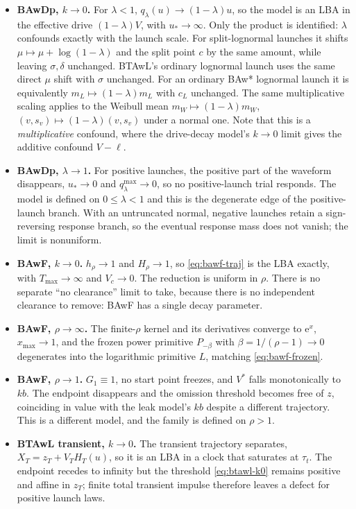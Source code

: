 \documentclass[12pt]{article}
\newcommand{\e}{\mathrm{e}}
\theoremstyle{remark}
\begin{document}
\begin{itemize}
  \item \textbf{BAwDp, $k \to 0$.} For $\lambda<1$, $q_{\lambda}(u) \to (1-\lambda)u$, so the model is an LBA in the effective drive $(1-\lambda)V$, with $u_{*}\to\infty$. Only the product is identified: $\lambda$ confounds exactly with the launch scale. For split-lognormal launches it shifts $\mu \mapsto \mu+\log(1-\lambda)$ and the split point $c$ by the same amount, while leaving $\sigma,\delta$ unchanged. BTAwL's ordinary lognormal launch uses the same direct $\mu$ shift with $\sigma$ unchanged. For an ordinary BAw* lognormal launch it is equivalently $m_L\mapsto(1-\lambda)m_L$ with $c_L$ unchanged. The same multiplicative scaling applies to the Weibull mean $m_W\mapsto(1-\lambda)m_W$, $(v,s_v)\mapsto(1-\lambda)(v,s_v)$ under a normal one. Note that this is a \emph{multiplicative} confound, where the drive-decay model's $k\to0$ limit gives the additive confound $V-\ell$.
  \item \textbf{BAwDp, $\lambda \to 1$.} For positive launches, the positive part of the waveform disappears, $u_{*}\to0$ and $q_{\lambda}^{\max}\to0$, so no positive-launch trial responds. The model is defined on $0\le\lambda<1$ and this is the degenerate edge of the positive-launch branch. With an untruncated normal, negative launches retain a sign-reversing response branch, so the eventual response mass does not vanish; the limit is nonuniform.
  \item \textbf{BAwF, $k \to 0$.} $h_\rho\to1$ and $H_\rho\to1$, so
        \eqref{eq:bawf-traj} is the LBA exactly, with $T_{\max}\to\infty$ and
        $V_c\to0$. The reduction is uniform in $\rho$. There is no separate ``no clearance'' limit to take, because there is no independent clearance to remove: BAwF has a single decay parameter.
  \item \textbf{BAwF, $\rho \to \infty$.} The finite-$\rho$ kernel and its derivatives converge to $\e^{x}$, $x_{\max}\to1$, and the frozen power primitive $P_{-\beta}$ with $\beta=1/(\rho-1)\to0$ degenerates into the logarithmic primitive $L$, matching \eqref{eq:bawf-frozen}.
  \item \textbf{BAwF, $\rho \to 1$.} $G_1\equiv1$, no start point freezes, and $V^{*}$ falls monotonically to $kb$. The endpoint disappears and the omission threshold becomes free of $z$, coinciding in value with the leak model's $kb$ despite a different trajectory. This is a different model, and the family is defined on $\rho>1$.
  \item \textbf{BTAwL transient, $k \to 0$.} The transient trajectory separates, $X_T=z_T+V_TH_T(u)$, so it is an LBA in a clock that saturates at $\tau_t$.  The endpoint recedes to infinity but the threshold \eqref{eq:btawl-k0} remains positive and affine in $z_T$; finite total transient impulse therefore leaves a defect for positive launch laws.

\end{itemize}
\end{document}
